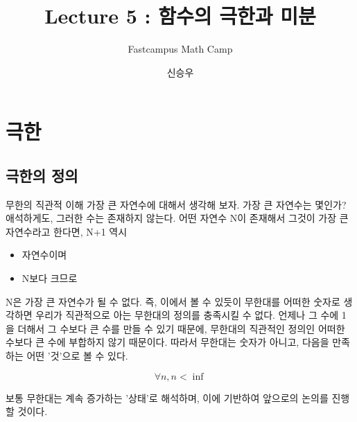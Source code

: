 \documentclass{beamer}
\title{Lecture 5 : 함수의 극한과 미분 }
\subtitle{Fastcampus Math Camp}
\author{신승우}
\begin{document}
\begin{frame}
 \titlepage
\end{frame}





\section{극한} 

\subsection{극한의 정의} 


\begin{frame}[allowframebreaks]{무한의 직관적 이해}
가장 큰 자연수에 대해서 생각해 보자. 가장 큰 자연수는 몇인가? \\
애석하게도, 그러한 수는 존재하지 않는다. 어떤 자연수 N이 존재해서 그것이 가장 큰 자연수라고 한다면, N+1 역시 
\begin{itemize} 
\item 자연수이며
\item N보다 크므로
\end{itemize}
N은 가장 큰 자연수가 될 수 없다. 즉, 이에서 볼 수 있듯이 무한대를 어떠한 숫자로 생각하면 우리가 직관적으로 아는 무한대의 정의를 충족시킬 수 없다. 언제나 그 수에 1을 더해서 그 수보다 큰 수를 만들 수 있기 때문에, 무한대의 직관적인 정의인 어떠한 수보다 큰 수에 부합하지 않기 때문이다. 따라서 무한대는 숫자가 아니고, 다음을 만족하는 어떤 '것'으로 볼 수 있다. 

\begin{equation} 
\forall n, n < \inf
\end{equation}

보통 무한대는 계속 증가하는 '상태'로 해석하며, 이에 기반하여 앞으로의 논의를 진행할 것이다. 
\end{frame} 
\end{document}
